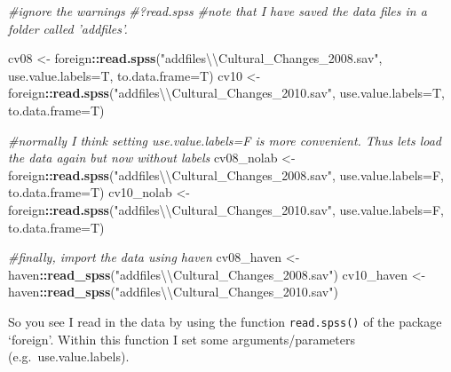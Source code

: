 \documentclass[
]{book}
\newenvironment{Shaded}{\begin{snugshade}}{\end{snugshade}}
\newcommand{\CharTok}[1]{\textcolor[rgb]{0.31,0.60,0.02}{#1}}
\newcommand{\CommentTok}[1]{\textcolor[rgb]{0.56,0.35,0.01}{\textit{#1}}}
\newcommand{\DataTypeTok}[1]{\textcolor[rgb]{0.13,0.29,0.53}{#1}}
\newcommand{\KeywordTok}[1]{\textcolor[rgb]{0.13,0.29,0.53}{\textbf{#1}}}
\newcommand{\NormalTok}[1]{#1}
\newcommand{\OperatorTok}[1]{\textcolor[rgb]{0.81,0.36,0.00}{\textbf{#1}}}
\newcommand{\StringTok}[1]{\textcolor[rgb]{0.31,0.60,0.02}{#1}}
\begin{document}
\begin{Shaded}
\begin{Highlighting}[numbers=left,,]
\CommentTok{#ignore the warnings  }
\CommentTok{#?read.spss}
\CommentTok{#note that I have saved the data files in a folder called 'addfiles'. }

\NormalTok{cv08 <-}\StringTok{ }\NormalTok{foreign}\OperatorTok{::}\KeywordTok{read.spss}\NormalTok{(}\StringTok{"addfiles}\CharTok{\textbackslash{}\textbackslash{}}\StringTok{Cultural_Changes_2008.sav"}\NormalTok{, }\DataTypeTok{use.value.labels=}\NormalTok{T, }\DataTypeTok{to.data.frame=}\NormalTok{T)}
\NormalTok{cv10 <-}\StringTok{ }\NormalTok{foreign}\OperatorTok{::}\KeywordTok{read.spss}\NormalTok{(}\StringTok{"addfiles}\CharTok{\textbackslash{}\textbackslash{}}\StringTok{Cultural_Changes_2010.sav"}\NormalTok{, }\DataTypeTok{use.value.labels=}\NormalTok{T, }\DataTypeTok{to.data.frame=}\NormalTok{T)}

\CommentTok{#normally I think setting use.value.labels=F is more convenient. Thus lets load the data again but now without labels }
\NormalTok{cv08_nolab <-}\StringTok{ }\NormalTok{foreign}\OperatorTok{::}\KeywordTok{read.spss}\NormalTok{(}\StringTok{"addfiles}\CharTok{\textbackslash{}\textbackslash{}}\StringTok{Cultural_Changes_2008.sav"}\NormalTok{, }\DataTypeTok{use.value.labels=}\NormalTok{F, }\DataTypeTok{to.data.frame=}\NormalTok{T)}
\NormalTok{cv10_nolab <-}\StringTok{ }\NormalTok{foreign}\OperatorTok{::}\KeywordTok{read.spss}\NormalTok{(}\StringTok{"addfiles}\CharTok{\textbackslash{}\textbackslash{}}\StringTok{Cultural_Changes_2010.sav"}\NormalTok{, }\DataTypeTok{use.value.labels=}\NormalTok{F, }\DataTypeTok{to.data.frame=}\NormalTok{T)}

\CommentTok{#finally, import the data using haven}
\NormalTok{cv08_haven <-}\StringTok{ }\NormalTok{haven}\OperatorTok{::}\KeywordTok{read_spss}\NormalTok{(}\StringTok{"addfiles}\CharTok{\textbackslash{}\textbackslash{}}\StringTok{Cultural_Changes_2008.sav"}\NormalTok{)}
\NormalTok{cv10_haven <-}\StringTok{ }\NormalTok{haven}\OperatorTok{::}\KeywordTok{read_spss}\NormalTok{(}\StringTok{"addfiles}\CharTok{\textbackslash{}\textbackslash{}}\StringTok{Cultural_Changes_2010.sav"}\NormalTok{)}
\end{Highlighting}
\end{Shaded}

So you see I read in the data by using the function \texttt{read.spss()} of the package `foreign'. Within this function I set some arguments/parameters (e.g.~use.value.labels).
\end{document}
